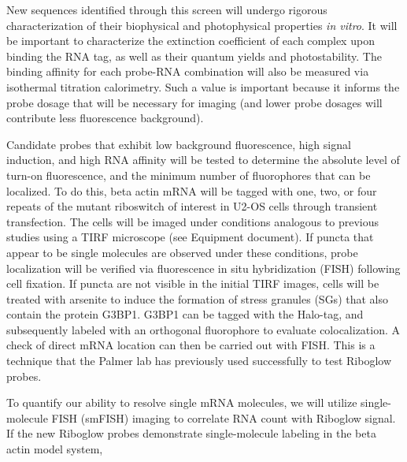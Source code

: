 New sequences identified through this screen will undergo rigorous characterization of their biophysical and photophysical properties \textit{in vitro}. It will be important to characterize the extinction coefficient of each complex upon binding the RNA tag, as well as their quantum yields and photostability. The binding affinity for each probe-RNA combination will also be measured via isothermal titration calorimetry. Such a value is important because it informs the probe dosage that will be necessary for imaging (and lower probe dosages will contribute less fluorescence background).

Candidate probes that exhibit low background fluorescence, high signal induction, and high RNA affinity will be tested to determine the absolute level of turn-on fluorescence, and the minimum number of fluorophores that can be localized. To do this, beta actin mRNA will be tagged with one, two, or four repeats of the mutant riboswitch of interest in U2-OS cells through transient transfection. The cells will be imaged under conditions analogous to previous studies\cite{KatzMappingtranslationhotspots2016} using a TIRF microscope (see Equipment document). If puncta that appear to be single molecules are observed under these conditions, probe localization will be verified via fluorescence in situ hybridization (FISH) following cell fixation. If puncta are not visible in the initial TIRF images, cells will be treated with arsenite to induce the formation of stress granules (SGs) that also contain the protein G3BP1\cite{ZurlaCharacterizingmRNAInteractions2011,JainATPaseModulatedStressGranules2016,NellesProgrammableRNATracking2016}.
G3BP1 can be tagged with the Halo-tag, and subsequently labeled with an orthogonal fluorophore to evaluate colocalization. A check of direct mRNA location can then be carried out with FISH.
This is a technique that the Palmer lab has previously used successfully to test Riboglow probes\cite{BraselmannDevelopmentriboswitchbasedplatform2017}.

To quantify our ability to resolve single mRNA molecules, we will utilize single-molecule FISH (smFISH) imaging to correlate RNA count with Riboglow signal.\cite{TutucciimprovedMS2system2018} If the new Riboglow probes demonstrate single-molecule labeling in the beta actin model system, 


